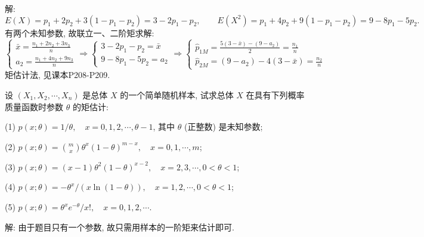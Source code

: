 \documentclass[standard]{ExBook}
\renewenvironment{shaded}{%
  \def\FrameCommand{\fboxsep=\FrameSep \colorbox{shadecolor}}%
  \MakeFramed{\advance\hsize-\width \FrameRestore}%
}{%
  \endMakeFramed
}
\begin{document}
\begin{qitems}
\vspace{\dimexpr2.5cm-5em\relax}

解:
$$
E(X)=p_1+2p_2+3(1-p_1-p_2)=3-2p_1-p_2,\qquad
E(X^2)=p_1+4p_2+9(1-p_1-p_2)=9-8p_1-5p_2.
$$
有两个未知参数, 故联立一、二阶矩求解:
$$
\left\{
\begin{array}{l}
\bar{x}=\displaystyle\frac{n_1+2n_2+3n_3}{n}\\
a_2=\displaystyle\frac{n_1+4n_2+9n_3}{n}
\end{array}
\right.
\Longrightarrow
\left\{
\begin{array}{l}
3-2p_1-p_2=\bar{x}\\
9-8p_1-5p_2=a_2
\end{array}
\right.
\Longrightarrow
\left\{
\begin{array}{l}
\hat{p}_{1M}=\displaystyle\frac{5(3-\bar{x})-(9-a_2)}{2}=\displaystyle\frac{n_1}{n}\\
\hat{p}_{2M}=(9-a_2)-4(3-\bar{x})=\displaystyle\frac{n_2}{n}
\end{array}
\right.
$$
\textcolor{themeColor}{\selectfont {} 矩估计法, 见课本P208-P209.}

\vspace{2.5cm-5em}

    \begin{bbox}
    \begin{shaded}
        \qitem
设 \((X_1, X_2, \cdots, X_n)\) 是总体 \(X\) 的一个简单随机样本, 试求总体 \(X\) 在具有下列概率质量函数时参数 \(\theta\) 的矩估计:

(1) \(p(x; \theta) = 1/\theta, \quad x = 0, 1, 2, \cdots, \theta - 1\), 其中 \(\theta\) (正整数) 是未知参数;

(2) \(p(x; \theta) = \displaystyle\binom{m}{x} \theta^x (1 - \theta)^{m - x}, \quad x = 0, 1, \cdots, m\);

(3) \(p(x; \theta) = (x - 1) \theta^2 (1 - \theta)^{x - 2}, \quad x = 2, 3, \cdots, 0 < \theta < 1\);

(4) \(p(x; \theta) = -\theta^x / \left(x \ln (1 - \theta)\right), \quad x = 1, 2, \cdots, 0 < \theta < 1\);

(5) \(p(x; \theta) = \theta^x e^{-\theta} / x!, \quad x = 0, 1, 2, \cdots\).
    \end{shaded}
    \end{bbox}

\vspace{\dimexpr2.5cm-5em\relax}

解: 由于题目只有一个参数, 故只需用样本的一阶矩来估计即可.


\end{qitems}
\end{document}
